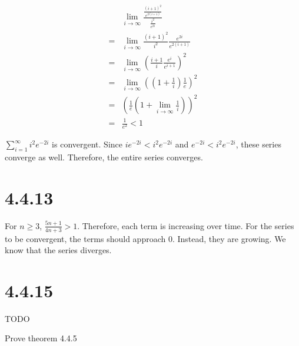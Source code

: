 \documentclass[12pt]{article}
\newcommand{\round}[1]{\left(       #1 \right)      }
\begin{document}
\begin{align*}
     & \lim_{i\to\infty} \frac{\frac{(i+1)^2}{e^{2(i+1)}}} {\frac{i^2}{e^{2i}}} \\
    =& \lim_{i\to\infty} \frac{(i+1)^2}{i^2} \frac{e^{2i}}{e^{2(i+1)}} \\
    =& \lim_{i\to\infty} \round{\frac{i+1}{i} \frac{e^{i}}{e^{i+1}}}^2 \\
    =& \lim_{i\to\infty} \round{\round{1+\frac{1}{i}} \frac{1}{e}}^2 \\
    =& \round{ \frac{1}{e} \round{1 + \lim_{i\to\infty} \frac{1}{i}} }^2 \\
    =& \frac{1}{e^2} < 1
\end{align*}

$\sum_{i=1}^\infty i^2 e^{-2i}$ is convergent. Since $i e^{-2i} < i^2 e^{-2i}$ and $e^{-2i} < i^2 e^{-2i}$, these series converge as well. Therefore, the entire series converges.



\section*{4.4.13}
For $n \geq 3$, $\frac{5n+1}{4n+3} > 1$. Therefore, each term is increasing over time. For the series to be convergent, the terms should approach 0. Instead, they are growing. We know that the series diverges.



\section*{4.4.15}
TODO

Prove theorem 4.4.5
\end{document}
